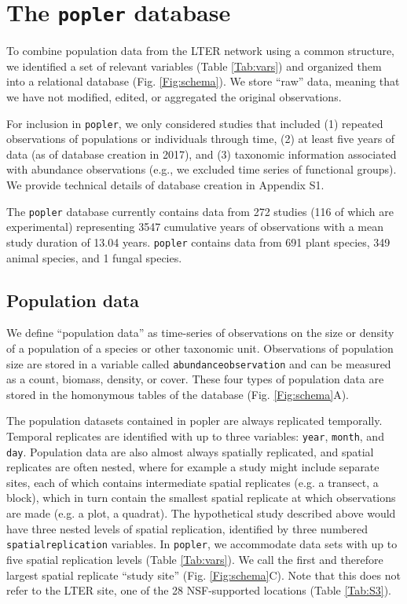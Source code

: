 \documentclass{article}\usepackage[]{graphicx}\usepackage[]{color}
\begin{document}
\section*{The \texttt{popler} database}
To combine population data from the LTER network using a common structure, we identified a set of relevant variables (Table \ref{Tab:vars}) and organized them into a relational database (Fig. \ref{Fig:schema}). We store ``raw'' data, meaning that we have not modified, edited, or aggregated the original observations. 

For inclusion in \texttt{popler}, we only considered studies that included (1) repeated observations of populations or individuals through time, (2) at least five years of data (as of database creation in 2017), and (3) taxonomic information associated with abundance observations (e.g., we excluded time series of functional groups). We provide technical details of database creation in Appendix S1.


The \texttt{popler} database currently contains data from 272 studies (116 of which are experimental) representing 3547 cumulative years of observations with a mean study duration of 13.04 years. \texttt{popler} contains data from 691 plant species, 349 animal species, and 1 fungal species.

\subsection*{Population data}
We define ``population data'' as time-series of observations on the size or density of a population of a species or other taxonomic unit. Observations of population size are stored in a variable called \texttt{abundance\textunderscore observation} and can be measured as a count, biomass, density, or cover. These four types of population data are stored in the homonymous tables of the database (Fig. \ref{Fig:schema}A).

The population datasets contained in popler are always replicated temporally. Temporal replicates are identified with up to three variables: \texttt{year}, \texttt{month}, and \texttt{day}. Population data are also almost always spatially replicated, and spatial replicates are often nested, where for example a study might include separate sites, each of which contains intermediate spatial replicates (e.g. a transect, a block), which in turn contain the smallest spatial replicate at which observations are made (e.g. a plot, a quadrat). The hypothetical study described above would have three nested levels of spatial replication, identified by three numbered \texttt{spatial\textunderscore replication} variables. In \texttt{popler}, we accommodate data sets with up to five spatial replication levels (Table \ref{Tab:vars}). We call the first and therefore largest spatial replicate ``study site'' (Fig. \ref{Fig:schema}C). Note that this does not refer to the LTER site, one of the 28 NSF-supported locations (Table \ref{Tab:S3}).
\end{document}
